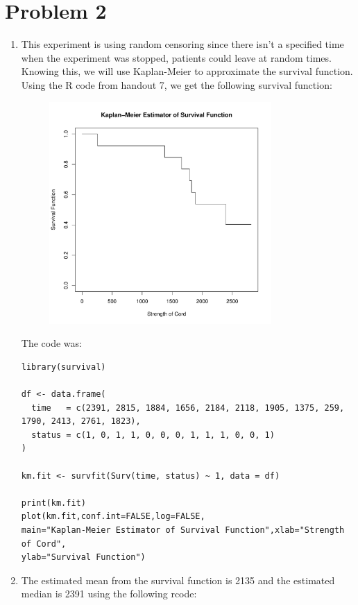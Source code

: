 \documentclass{article}
\begin{document}
\section*{Problem 2}
\begin{enumerate}
\item This experiment is using random censoring since there isn't a specified time when the experiment was stopped, patients could leave at random times. Knowing this, we will use Kaplan-Meier to approximate the survival function. Using the R code from handout 7, we get the following survival function: \\
\begin{figure}[htbp]
    \centering
    \includegraphics[width=0.8\textwidth]{Rplots.pdf}
\end{figure}
\newpage
The code was: \\
\begin{verbatim}
library(survival)

df <- data.frame(
  time   = c(2391, 2815, 1884, 1656, 2184, 2118, 1905, 1375, 259, 1790, 2413, 2761, 1823),
  status = c(1, 0, 1, 1, 0, 0, 0, 1, 1, 1, 0, 0, 1)
)

km.fit <- survfit(Surv(time, status) ~ 1, data = df)

print(km.fit)
plot(km.fit,conf.int=FALSE,log=FALSE,
main="Kaplan-Meier Estimator of Survival Function",xlab="Strength of Cord",
ylab="Survival Function")
\end{verbatim}
\item The estimated mean from the survival function is 2135 and the estimated median is 2391 using the following rcode: \\
\begin{verbatim}
  
\end{verbatim}
\end{enumerate}
\end{document}
